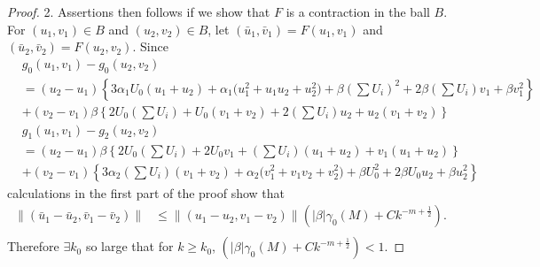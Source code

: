 \documentclass[a4paper,11pt]{article}
\numberwithin{step}{dummy}
\begin{document}
\begin{proof}
2. Assertions then follows if we show that $F$ is a contraction in the ball $B$. For $(u_1,v_1)\in B$ and $(u_2,v_2) \in B$, let $(\bar{u}_1, \bar{v}_1) = F(u_1,v_1)$ and $(\bar{u}_2, \bar{v}_2) = F(u_2,v_2)$. Since
\begin{align*} 
&g_0(u_1,v_1) - g_0(u_2,v_2)\\
&=(u_2 - u_1)\left\{ 3\alpha_1U_0(u_1+u_2) + \alpha_1\big(u_1^2+u_1u_2 + u_2^2\big) + \beta \left(\sum U_i\right)^2 + 2\beta \left(\sum U_i\right) v_1 + \beta v_1^2\right\}\\
&+ (v_2-v_1)\beta\left\{ 2U_0 \left(\sum U_i\right) + U_0(v_1+v_2) + 2\left( \sum U_i\right)u_2 + u_2(v_1+v_2)\right\} \\ 
&g_1(u_1,v_1) - g_2(u_2,v_2)\\
&=(u_2 - u_1)\beta\left\{ 2U_0\left(\sum U_i\right) + 2U_0v_1 + \left(\sum U_i\right)(u_1+u_2) +v_1(u_1+u_2)\right\}\\
&+ (v_2-v_1)\left\{ 3\alpha_2\left(\sum U_i\right)(v_1+v_2) + \alpha_2\big(v_1^2 + v_1v_2 + v_2^2\big) + \beta U_0^2 + 2\beta U_0u_2 + \beta u_2^2\right\}
\end{align*}
calculations in the first part of the proof show that
\begin{align*}
 \|(\bar{u}_1 - \bar{u}_2, \bar{v}_1 - \bar{v}_2)\| &\le \|(u_1 - u_2,v_1-v_2)\| \left( |\beta|\gamma_0(M) + Ck^{-m+ \frac{1}{2}}\right). \\
\end{align*}
Therefore $\exists k_0$ so large that for $k \ge k_0$, $\left( |\beta|\gamma_0(M) + Ck^{-m+ \frac{1}{2}}\right) < 1$.



\end{proof}
\end{document}
